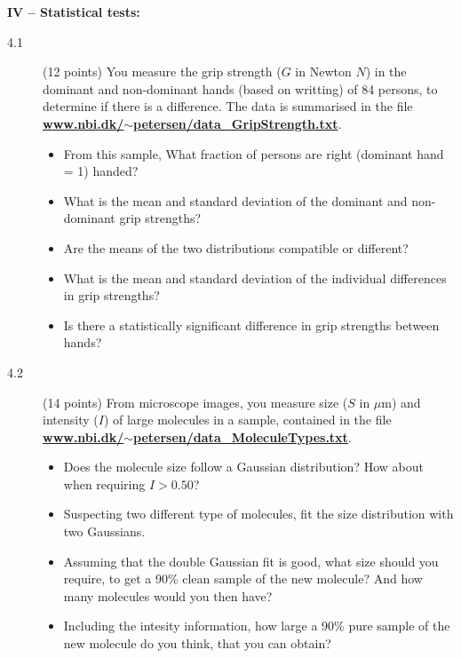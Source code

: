 \documentclass[11pt]{article}
\begin{document}

\noindent
{\bf IV -- Statistical tests:}
\begin{description}
\item[4.1] (12 points)
  You measure the grip strength ($G$ in Newton $N$) in the dominant and non-dominant hands (based on writting) of 84 persons, to determine if there is a difference. The data is summarised in the file \href{http://www.nbi.dk/~petersen/data\_GripStrength.txt}{\bf www.nbi.dk/$\sim$petersen/data\_GripStrength.txt}.
  \vspace*{-1ex}
  \begin{itemize}
    \item From this sample, What fraction of persons are right (dominant hand = 1) handed?
    \item What is the mean and standard deviation of the dominant and non-dominant grip strengths?
    \item Are the means of the two distributions compatible or different?
    \item What is the mean and standard deviation of the individual differences in grip strengths?
    \item Is there a statistically significant difference in grip strengths between hands?
  \end{itemize}
%
\item[4.2] (14 points)
  From microscope images, you measure size ($S$ in $\mu$m) and intensity ($I$) of large molecules in a sample,
  contained in the file \href{http://www.nbi.dk/~petersen/data\_MoleculeTypes.txt}{\bf www.nbi.dk/$\sim$petersen/data\_MoleculeTypes.txt}.
  \vspace*{-1ex}
  \begin{itemize}
    \item Does the molecule size follow a Gaussian distribution? How about when requiring $I > 0.50$?
    \item Suspecting two different type of molecules, fit the size distribution with two Gaussians.
    \item Assuming that the double Gaussian fit is good, what size should you require, to get a
      90\% clean sample of the new molecule? And how many molecules would you then have?
    \item Including the intesity information, how large a 90\% pure sample of the new molecule do you
      think, that you can obtain?
  \end{itemize}
\end{description}
\end{document}
